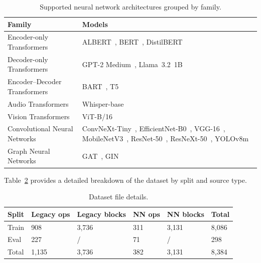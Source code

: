 \begin{table}[H]
    \centering
    \caption{Supported neural network architectures grouped by family.}
    \label{tab:dataset-models}
    \vspace{0.2cm}
    \begin{tabularx}{\textwidth}{l X}
        \toprule
        \textbf{Family} & \textbf{Models} \\
        \midrule
        Encoder-only Transformers & ALBERT~\cite{lan2020albert}, BERT~\cite{devlin2019bert}, DistilBERT~\cite{sanh2019distilbert} \\
        \addlinespace
        Decoder-only Transformers & GPT-2 Medium~\cite{radford2019gpt2}, Llama~3.2~1B~\cite{llamateam2024llama3} \\
        \addlinespace
        Encoder--Decoder Transformers & BART~\cite{lewis2020bart}, T5~\cite{raffel2020t5} \\
        \addlinespace
        Audio Transformers & Whisper-base~\cite{radford2023whisper} \\
        \addlinespace
        Vision Transformers & ViT-B/16~\cite{dosovitskiy2021vit} \\
        \addlinespace
        Convolutional Neural Networks & ConvNeXt-Tiny~\cite{liu2022convnext}, EfficientNet-B0~\cite{tan2019efficientnet}, VGG-16~\cite{simonyan2015vgg}, MobileNetV3~\cite{howard2019mobilenetv3}, ResNet-50~\cite{he2016resnet}, ResNeXt-50~\cite{xie2017resnext}, YOLOv8m~\cite{jocher2023yolov8} \\
        \addlinespace
        Graph Neural Networks & GAT~\cite{velickovic2018gat}, GIN~\cite{xu2019gin} \\
        \bottomrule
    \end{tabularx}
\end{table}

Table~\ref{tab:dataset-stats} provides a detailed breakdown of the dataset by split and source type.

\begin{table}[H]
    \centering
    \caption{Dataset file details.}
    \label{tab:dataset-stats}
    \vspace{0.2cm}
    \begin{tabularx}{\textwidth}{l X X X X X}
        \toprule
        \textbf{Split} & \textbf{Legacy ops} & \textbf{Legacy blocks} & \textbf{NN ops} & \textbf{NN blocks} & \textbf{Total} \\
        \midrule
        Train & 908 & 3{,}736 & 311 & 3{,}131 & 8{,}086 \\
        \addlinespace
        Eval & 227 & / & 71 & / & 298 \\
        \addlinespace
        Total & 1{,}135 & 3{,}736 & 382 & 3{,}131 & 8{,}384 \\
        \bottomrule
    \end{tabularx}
\end{table}

